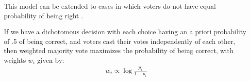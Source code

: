 This model can be extended to cases in which voters do not have equal probability of being right \cite{Nitzan1982, Shapley1984}.

\begin{theorem}
 If we have a dichotomous decision with each choice having an a priori probability of .5 of being correct, and voters cast their votes independently of each other, then weighted majority vote maximizes the probability of being correct, with weights $w_i$ given by:
 \begin{align*}
 w_i \propto \log \frac{p_i}{1 - p_i}
 \end{align*}
\end{theorem}